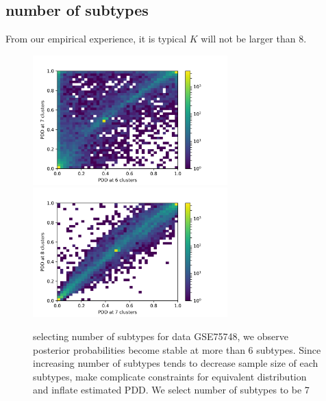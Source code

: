 \documentclass[11pt]{amsart}
\begin{document}
\subsection{number of subtypes}
From our empirical experience, it is typical $K$ will not be larger than 8.
\begin{figure}[H]
  \includegraphics[height = 5cm, width=\linewidth]{DN_67.png}
\endminipage\hfill
{}
  \includegraphics[height = 5cm, width=\linewidth]{DN_78.png}
\endminipage\hfill
\caption{selecting number of subtypes for data GSE75748, we observe posterior probabilities become stable at more than 6 subtypes. Since increasing number of subtypes tends to decrease sample size of each subtypes, make complicate constraints for equivalent distribution and inflate estimated PDD.  We select number of subtypes to be 7}
\end{figure}
\end{document}
